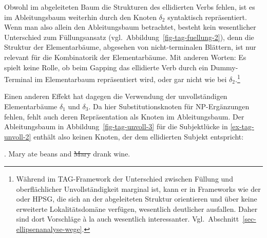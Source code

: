 Obwohl im abgeleiteten Baum die Strukturen des ellidierten Verbs fehlen, ist es im Ableitungsbaum weiterhin durch den Knoten $\delta_2$ syntaktisch repräsentiert. Wenn man also allein den Ableitungsbaum betrachtet, besteht kein wesentlicher Unterschied zum Füllungsansatz (vgl.\ Abbildung~\ref{fig-tag-fuellung-2}), denn die Struktur der Elementarbäume, abgesehen von nicht-terminalen Blättern, ist nur relevant für die Kombinatorik der Elementarbäume. Mit anderen Worten: Es spielt keine Rolle, ob beim Gapping das ellidierte Verb durch ein Dummy-Terminal im Elementarbaum repräsentiert wird, oder gar nicht wie bei $\delta_2$.\footnote{Während im TAG-Framework der Unterschied zwischen Füllung und oberflächlicher Unvollständigkeit marginal ist, kann er in Frameworks wie der  oder HPSG, die sich an der abgeleiteten Struktur orientieren und über keine erweiterte Lokalitätsdomäne verfügen, wesentlich deutlicher ausfallen. Daher sind dort Vorschläge \`a la \cite{Chao:87} auch wesentlich interessanter. Vgl.\ Abschnitt~\ref{sec-ellipsenanalyse-wege}.}

Einen anderen Effekt hat dagegen die Verwendung der unvollständigen Elementarbäume $\delta_1$ und $\delta_3$. Da hier Substitutionsknoten für NP-Ergänzungen fehlen, fehlt auch deren Repräsentation als Knoten im Ableitungsbaum. Der Ableitungsbaum in Abbildung~\ref{fig-tag-unvoll-3} für die Subjektlücke in \ref{ex-tag-unvoll-2} enthält also keinen Knoten, der dem ellidierten Subjekt entspricht:

\ex. \label{ex-tag-unvoll-2} Mary ate beans and \sout{Mary} drank wine.

